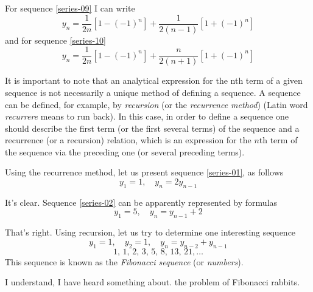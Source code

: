 {\rdr For sequence  \eqref{series-09} I can write
\begin{equation*}%
y_{n}  = \frac{1}{2n} \left[1 - (-1)^{n} \right]+  \frac{1}{2(n-1)} \left[1 + (-1)^{n} \right] 
\end{equation*}
and for sequence \eqref{series-10}
\begin{equation*}%
y_{n}  = \frac{1}{2n} \left[1 - (-1)^{n} \right]+  \frac{n}{2(n+1)} \left[1 + (-1)^{n} \right] 
\end{equation*}

\athr It is important to note that an analytical expression for the nth term of a given sequence is not necessarily a unique method of defining a sequence. A sequence can be defined, for example, by \emph{recursion} (or the \emph{recurrence method}) (Latin word \emph{recurrere} means to run back). In this case, in order to define a sequence one should describe the first term (or the first several terms) of the sequence and a recurrence (or a recursion) relation, which is an expression for the $n$th term of the sequence via the preceding one (or several preceding terms).

Using the recurrence method, let us present sequence \eqref{series-01}, as follows
\begin{equation*}%
y_{1	} = 1, \quad y_{n}  = 2  y_{n - 1}  
\end{equation*}

\rdr It's clear. Sequence \eqref{series-02} can be apparently represented by formulas 
\begin{equation*}%
y_{1	} = 5, \quad y_{n}  = y_{n - 1}  + 2
\end{equation*}

\athr That's right. Using recursion, let us try to determine one interesting sequence
\begin{equation*}%
y_{1	} = 1, \quad y_{2} = 1, \quad y_{n}  =   y_{n - 2} +   y_{n - 1}  
\end{equation*}
\begin{equation}%
1, \, 1, \, 2, \, 3, \, 5, \, 8, \, 13, \, 21, \ldots
\label{fibonacci}
\end{equation}
This sequence is known as the \emph{Fibonacci sequence} (or \emph{numbers}).

\rdr I understand, I have heard something about. the problem of Fibonacci rabbits.

}
